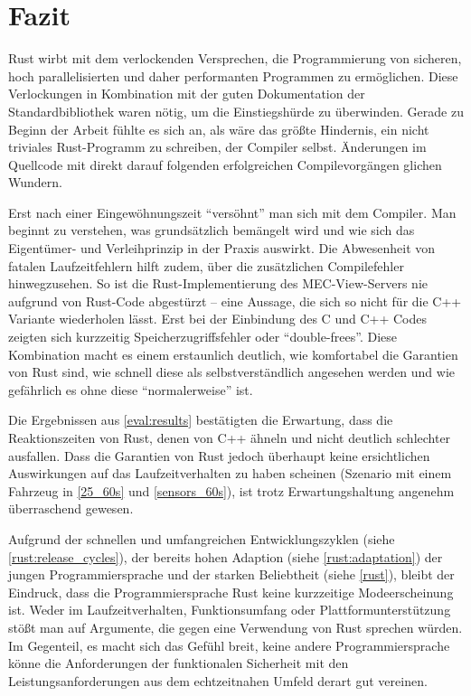 \chapter{Fazit}
\label{conclusion}


Rust wirbt mit dem verlockenden Versprechen, die Programmierung von sicheren, hoch parallelisierten und daher performanten Programmen zu ermöglichen.
Diese Verlockungen in Kombination mit der guten Dokumentation der Standardbibliothek waren nötig, um die Einstiegshürde zu überwinden.
Gerade zu Beginn der Arbeit fühlte es sich an, als wäre das größte Hindernis, ein nicht triviales Rust-Programm zu schreiben, der Compiler selbst.
Änderungen im Quellcode mit direkt darauf folgenden erfolgreichen Compilevorgängen glichen Wundern.

Erst nach einer Eingewöhnungszeit \enquote{versöhnt} man sich mit dem Compiler.
Man beginnt zu verstehen, was grundsätzlich bemängelt wird und wie sich das Eigentümer- und Verleihprinzip in der Praxis auswirkt.
Die Abwesenheit von fatalen Laufzeitfehlern hilft zudem, über die zusätzlichen Compilefehler hinwegzusehen.
So ist die Rust-Implementierung des MEC-View-Servers nie aufgrund von Rust-Code abgestürzt -- eine Aussage, die sich so nicht für die C++ Variante wiederholen lässt.
Erst bei der Einbindung des C und C++ Codes zeigten sich kurzzeitig Speicherzugriffsfehler oder \enquote{double-frees}.
Diese Kombination macht es einem erstaunlich deutlich, wie komfortabel die Garantien von Rust sind, wie schnell diese als selbstverständlich angesehen werden und wie gefährlich es ohne diese \enquote{normalerweise} ist.

Die Ergebnissen aus \autoref{eval:results} bestätigten die Erwartung, dass die Reaktionszeiten von Rust, denen von C++ ähneln und nicht deutlich schlechter ausfallen.
Dass die Garantien von Rust jedoch überhaupt keine ersichtlichen Auswirkungen auf das Laufzeitverhalten zu haben scheinen (Szenario mit einem Fahrzeug in \autoref{25_60s} und \autoref{sensors_60s}), ist trotz Erwartungshaltung angenehm überraschend gewesen.

Aufgrund der schnellen und umfangreichen Entwicklungszyklen (siehe \autoref{rust:release_cycles}), der bereits hohen Adaption (siehe \autoref{rust:adaptation}) der jungen Programmiersprache und der starken Beliebtheit (siehe \autoref{rust}), bleibt der Eindruck, dass die Programmiersprache Rust keine kurzzeitige Modeerscheinung ist.
Weder im Laufzeitverhalten, Funktionsumfang oder Plattformunterstützung stößt man auf Argumente, die gegen eine Verwendung von Rust sprechen würden.
Im Gegenteil, es macht sich das Gefühl breit, keine andere Programmiersprache könne die Anforderungen der funktionalen Sicherheit mit den Leistungsanforderungen aus dem echtzeitnahen Umfeld derart gut vereinen.

